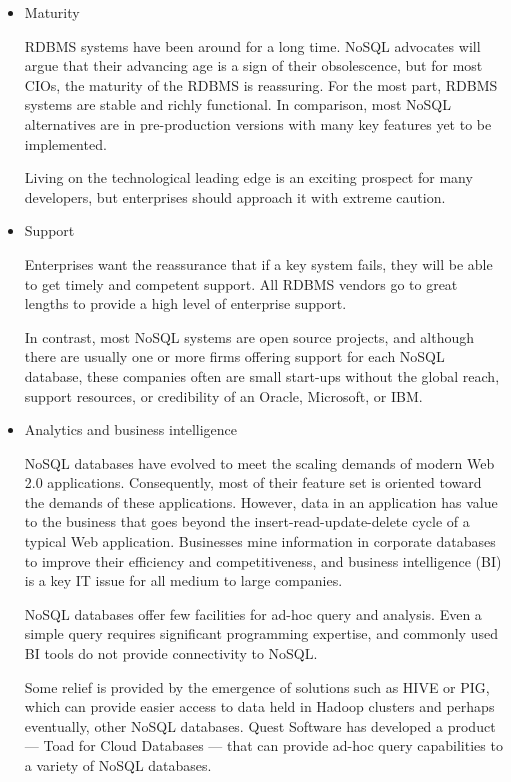 \begin{itemize}

\item Maturity

RDBMS systems have been around for a long time. NoSQL advocates will argue that their advancing age is a sign of their obsolescence, but for most CIOs, the maturity of the RDBMS is reassuring. For the most part, RDBMS systems are stable and richly functional. In comparison, most NoSQL alternatives are in pre-production versions with many key features yet to be implemented.

Living on the technological leading edge is an exciting prospect for many developers, but enterprises should approach it with extreme caution.

\item Support

Enterprises want the reassurance that if a key system fails, they will be able to get timely and competent support. All RDBMS vendors go to great lengths to provide a high level of enterprise support.

In contrast, most NoSQL systems are open source projects, and although there are usually one or more firms offering support for each NoSQL database, these companies often are small start-ups without the global reach, support resources, or credibility of an Oracle, Microsoft, or IBM.

\item Analytics and business intelligence

NoSQL databases have evolved to meet the scaling demands of modern Web 2.0 applications. Consequently, most of their feature set is oriented toward the demands of these applications. However, data in an application has value to the business that goes beyond the insert-read-update-delete cycle of a typical Web application. Businesses mine information in corporate databases to improve their efficiency and competitiveness, and business intelligence (BI) is a key IT issue for all medium to large companies.

NoSQL databases offer few facilities for ad-hoc query and analysis. Even a simple query requires significant programming expertise, and commonly used BI tools do not provide connectivity to NoSQL.

Some relief is provided by the emergence of solutions such as HIVE or PIG, which can provide easier access to data held in Hadoop clusters and perhaps eventually, other NoSQL databases. Quest Software has developed a product — Toad for Cloud Databases — that can provide ad-hoc query capabilities to a variety of NoSQL databases.


\end{itemize}
